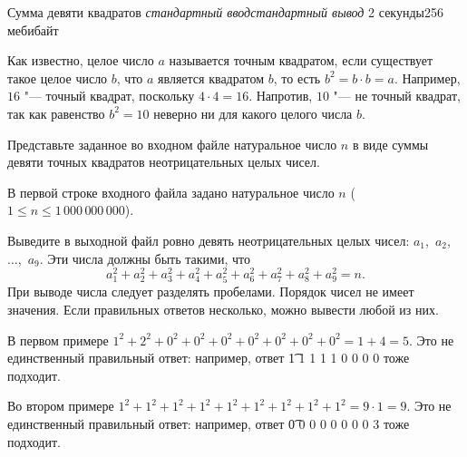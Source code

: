 
\gdef\thisproblemauthor{Иван Казменко}
\begin{problem}{Сумма девяти квадратов}
{\textsl{стандартный ввод}}{\textsl{стандартный вывод}}
{2 секунды}{256 мебибайт}{}

Как известно, целое число $a$ называется точным квадратом, если
существует такое целое число $b$, что $a$ является квадратом $b$,
то есть $b^2 = b \cdot b = a$.
Например, $16$ "--- точный квадрат, поскольку $4 \cdot 4 = 16$.
Напротив, $10$ "--- не точный квадрат, так как равенство $b^2 = 10$
неверно ни для какого целого числа $b$.

Представьте заданное во входном файле натуральное число $n$
в виде суммы девяти точных квадратов неотрицательных целых чисел.

\InputFile

В первой строке входного файла задано натуральное число $n$
($1 \le n \le 1\,000\,000\,000$).

\OutputFile

Выведите в выходной файл ровно девять неотрицательных целых чисел:
$a_1$,~$a_2$,~$\ldots$,~$a_9$.
Эти числа должны быть такими, что
$$a_1^2 + a_2^2 + a_3^2 + a_4^2 + a_5^2 + a_6^2 + a_7^2 + a_8^2 + a_9^2 =
 n\text{.}$$
При выводе числа следует разделять пробелами.
Порядок чисел не имеет значения.
Если правильных ответов несколько, можно вывести любой из них.

\Examples

\begin{example}%
%
%
\end{example}

\Explanations

В первом примере
$1^2 + 2^2 + 0^2 + 0^2 + 0^2 + 0^2 + 0^2 + 0^2 + 0^2 = 1 + 4 = 5$.
Это не единственный правильный ответ: например,
ответ \t{1 1 1 1 1 0 0 0 0} тоже подходит.

Во втором примере
$1^2 + 1^2 + 1^2 + 1^2 + 1^2 + 1^2 + 1^2 + 1^2 + 1^2 = 9 \cdot 1 = 9$.
Это не единственный правильный ответ: например,
ответ \t{0 0 0 0 0 0 0 0 3} тоже подходит.

\end{problem}
